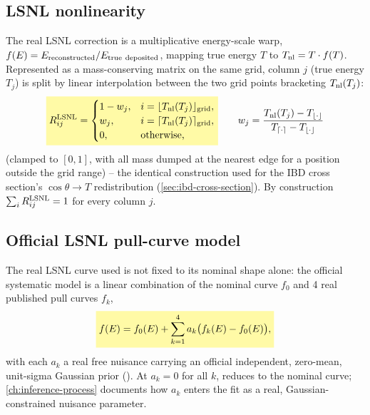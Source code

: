 \begin{theorybox}
\subsection*{LSNL nonlinearity}
The real LSNL correction is a multiplicative energy-scale warp,
$f(E)=E_{\rm reconstructed}/E_{\rm true\ deposited}$, mapping true energy
$T$ to $T_{\rm nl}=T\cdot f(T)$. Represented as a mass-conserving matrix on
the same grid, column $j$ (true energy $T_j$) is split by linear
interpolation between the two grid points bracketing $T_{\rm nl}(T_j)$:
\begin{equation}
  \keyresult{R^{\rm LSNL}_{ij} = \begin{cases}
    1-w_j, & i = \lfloor T_{\rm nl}(T_j)\rfloor_{\rm grid}, \\
    w_j, & i = \lceil T_{\rm nl}(T_j)\rceil_{\rm grid}, \\
    0, & \text{otherwise,}
  \end{cases}}
  \qquad w_j = \frac{T_{\rm nl}(T_j)-T_{\lfloor\cdot\rfloor}}{T_{\lceil\cdot\rceil}-T_{\lfloor\cdot\rfloor}}
  \label{eq:iav-warp-weights}
\end{equation}
(clamped to $[0,1]$, with all mass dumped at the nearest edge for a
position outside the grid range) -- the identical construction used for
the IBD cross section's $\cos\theta\to T$ redistribution
(\cref{sec:ibd-cross-section}). By construction $\sum_i R^{\rm LSNL}_{ij}=1$
for every column $j$.

\subsection*{Official LSNL pull-curve model}
The real LSNL curve used is not fixed to its nominal shape alone: the
official systematic model is a linear combination of the nominal curve
$f_0$ and 4 real published pull curves $f_k$,
\begin{equation}
  \keyresult{f(E) = f_0(E) + \sum_{k=1}^{4} a_k\bigl(f_k(E)-f_0(E)\bigr),}
  \label{eq:lsnl-pull-model}
\end{equation}
with each $a_k$ a real free nuisance carrying an official independent,
zero-mean, unit-sigma Gaussian prior ().
At $a_k=0$ for all $k$,  reduces to the
nominal curve; \cref{ch:inference-process} documents how $a_k$ enters the
fit as a real, Gaussian-constrained nuisance parameter.


\end{theorybox}
